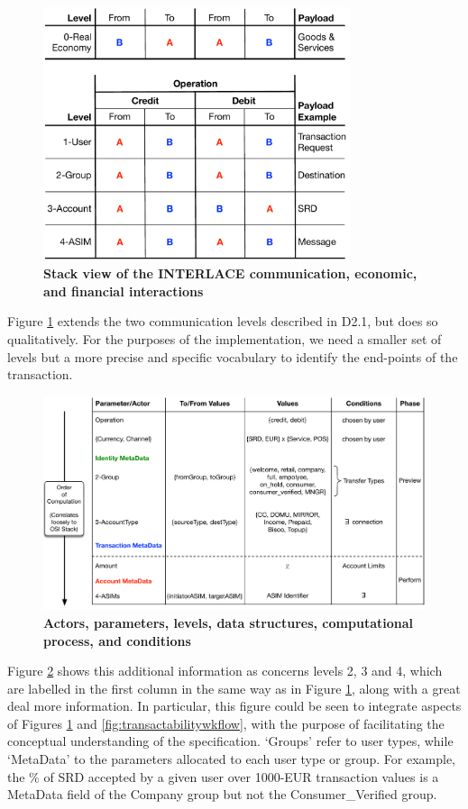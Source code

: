 \begin{figure}[htbp]
\centering
\includegraphics[width=9cm]{Figures/Stack}
\caption{\small\textbf{Stack view of the INTERLACE communication, economic, and financial  interactions}}
\label{fig:stack}
\end{figure}
\vspace{-0.5cm}

Figure \ref{fig:stack} extends the two communication levels described in D2.1, but does so qualitatively. For the purposes of the implementation, we need a smaller set of levels but a more precise and specific vocabulary to identify the end-points of the transaction.

\begin{figure}[htbp]
\centering
\includegraphics[width=17cm]{Figures/Vocabulary}
\caption{\small\textbf{Actors, parameters, levels, data structures, computational process, and conditions}}
\label{fig:vocabulary}
\end{figure}

Figure \ref{fig:vocabulary} shows this additional information as concerns levels 2, 3 and 4, which are labelled in the first column in the same way as in Figure \ref{fig:stack}, along with a great deal more information. In particular, this figure could be seen to integrate aspects of Figures \ref{fig:stack} and \ref{fig:transactabilitywkflow}, with the purpose of facilitating the conceptual understanding of the specification. `Groups' refer to user types, while `MetaData' to the parameters allocated to each user type or group. For example, the $\%$ of SRD accepted by a given user over 1000-EUR transaction values is a MetaData field of the Company group but not the Consumer\_Verified group.

